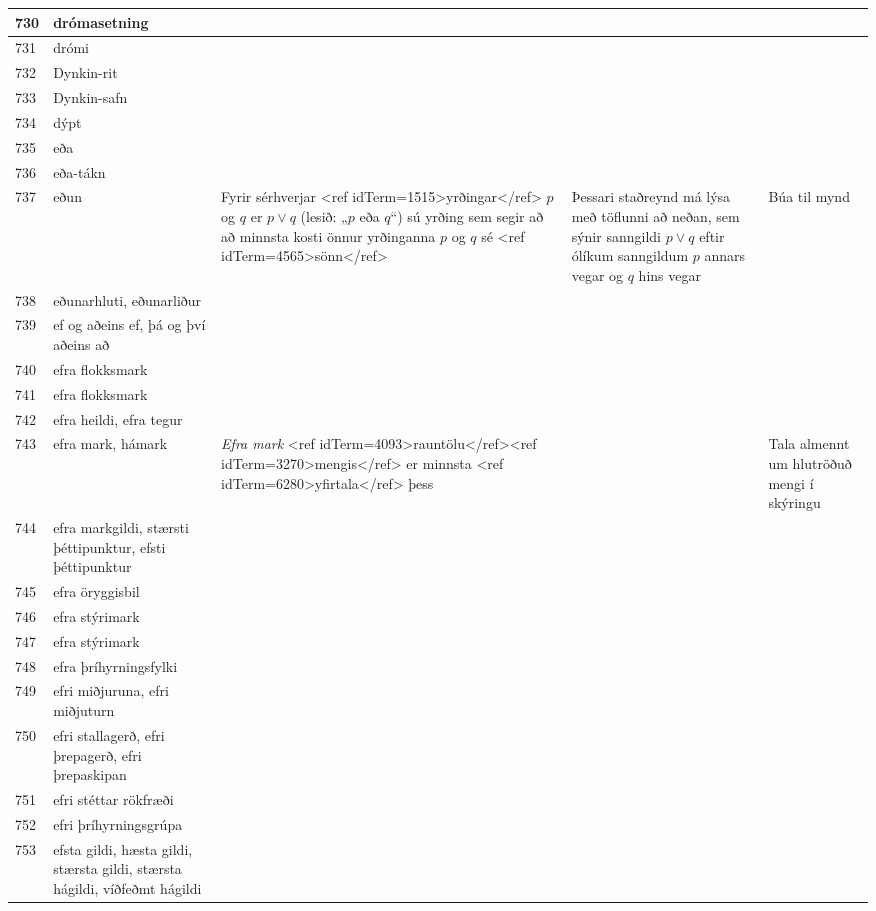 \begin{longtable}{p{}|p{}|p{}|p{}|p{}}
730 & drómasetning &  &  &  \\
\hline
731 & drómi &  &  &  \\
\hline
732 & Dynkin-rit &  &  &  \\
\hline
733 & Dynkin-safn &  &  &  \\
\hline
734 & dýpt &  &  &  \\
\hline
735 & eða &  &  &  \\
\hline
736 & eða-tákn &  &  &  \\
\hline
737 & eðun & Fyrir sérhverjar <ref idTerm=1515>yrðingar</ref> $p$ og $q$ er $p \vee q$ (lesið: „$p$ eða $q$“) sú yrðing sem segir að að minnsta kosti önnur yrðinganna $p$ og $q$ sé <ref idTerm=4565>sönn</ref> & Þessari staðreynd má lýsa með töflunni að neðan, sem sýnir sanngildi $p \vee q$ eftir ólíkum sanngildum $p$ annars vegar og $q$ hins vegar & Búa til mynd \\
\hline
738 & eðunarhluti, eðunarliður &  &  &  \\
\hline
739 & ef og aðeins ef, þá og því aðeins að &  &  &  \\
\hline
740 & efra flokksmark &  &  &  \\
\hline
741 & efra flokksmark &  &  &  \\
\hline
742 & efra heildi, efra tegur &  &  &  \\
\hline
743 & efra mark, hámark & \textit{Efra mark} <ref idTerm=4093>rauntölu</ref><ref idTerm=3270>mengis</ref> er minnsta <ref idTerm=6280>yfirtala</ref> þess &  & Tala almennt um hlutröðuð mengi í skýringu \\
\hline
744 & efra markgildi, stærsti þéttipunktur, efsti þéttipunktur &  &  &  \\
\hline
745 & efra öryggisbil &  &  &  \\
\hline
746 & efra stýrimark &  &  &  \\
\hline
747 & efra stýrimark &  &  &  \\
\hline
748 & efra þríhyrningsfylki &  &  &  \\
\hline
749 & efri miðjuruna, efri miðjuturn &  &  &  \\
\hline
750 & efri stallagerð, efri þrepagerð, efri þrepaskipan &  &  &  \\
\hline
751 & efri stéttar rökfræði &  &  &  \\
\hline
752 & efri þríhyrningsgrúpa &  &  &  \\
\hline
753 & efsta gildi, hæsta gildi, stærsta gildi, stærsta hágildi, víðfeðmt hágildi &  &  &  \\
\hline

\end{longtable}
